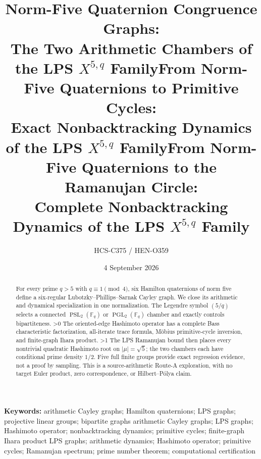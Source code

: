 \documentclass[10pt]{article}
\title{Norm-Five Quaternion Congruence Graphs:\\
The Two Arithmetic Chambers of the LPS $X^{5,q}$ Family}
\title{From Norm-Five Quaternions to Primitive Cycles:\\
Exact Nonbacktracking Dynamics of the LPS $X^{5,q}$ Family}
\title{From Norm-Five Quaternions to the Ramanujan Circle:\\
Complete Nonbacktracking Dynamics of the LPS $X^{5,q}$ Family}
\author{HCS-C375 / HEN-O359}
\date{4 September 2026}
\providecommand{\CRevisionRound}{2}
\newcommand{\Fq}{\mathbb F_q}
\newcommand{\PSL}{\operatorname{PSL}}
\newcommand{\PGL}{\operatorname{PGL}}
\begin{document}
\maketitle

\begin{abstract}
For every prime $q>5$ with $q\equiv1\pmod4$, six Hamilton quaternions of
norm five define a six-regular Lubotzky--Phillips--Sarnak Cayley graph.
We close its arithmetic and dynamical specialization in one normalization.
The Legendre symbol $(5/q)$ selects a connected $\PSL_2(\Fq)$ or
$\PGL_2(\Fq)$ chamber and exactly controls bipartiteness.
\ifnum\CRevisionRound>0
The oriented-edge Hashimoto operator has a complete Bass characteristic
factorization, all-iterate trace formula, M\"obius primitive-cycle inversion,
and finite-graph Ihara product.
\fi
\ifnum\CRevisionRound>1
The LPS Ramanujan bound then places every nontrivial quadratic Hashimoto
root on $|\mu|=\sqrt5$; the two chambers each have conditional prime density
$1/2$. Five full finite groups provide exact regression evidence, not a
proof by sampling. This is a source-arithmetic Route-A exploration, with no
target Euler product, zero correspondence, or Hilbert--P\'olya claim.
\fi
\end{abstract}

\noindent\textbf{Keywords:}
\ifcase\CRevisionRound
arithmetic Cayley graphs; Hamilton quaternions; LPS graphs; projective
linear groups; bipartite graphs
\or
arithmetic Cayley graphs; LPS graphs; Hashimoto operator; nonbacktracking
dynamics; primitive cycles; finite-graph Ihara product
\else
LPS graphs; arithmetic dynamics; Hashimoto operator; primitive cycles;
Ramanujan spectrum; prime number theorem; computational certification
\fi
\end{document}
